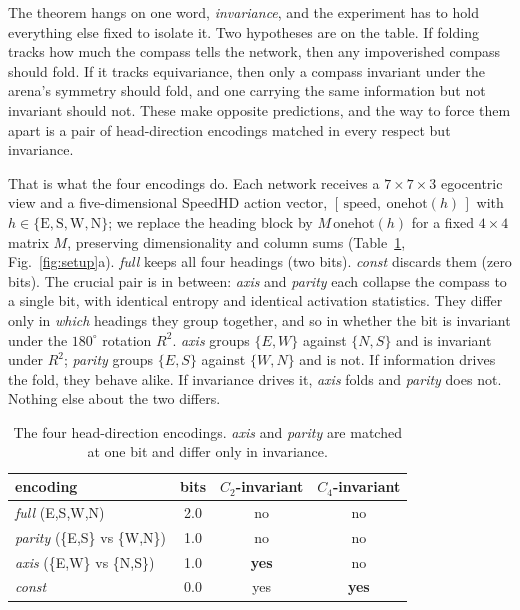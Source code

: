\documentclass[9pt,lineno]{elife}
\begin{document}
The theorem hangs on one word, \emph{invariance}, and the experiment has to hold everything else
fixed to isolate it. Two hypotheses are on the table. If folding tracks how much the compass tells the
network, then any impoverished compass should fold. If it tracks equivariance, then only a compass
invariant under the arena's symmetry should fold, and one carrying the same information but not
invariant should not. These make opposite predictions, and the way to force them apart is a pair of
head-direction encodings matched in every respect but invariance.

That is what the four encodings do. Each network receives a $7\times7\times3$ egocentric view and a
five-dimensional SpeedHD action vector, $[\,\text{speed},\ \mathrm{onehot}(h)\,]$ with $h \in
\{\text{E},\text{S},\text{W},\text{N}\}$; we replace the heading block by $M\,\mathrm{onehot}(h)$ for
a fixed $4\times4$ matrix $M$, preserving dimensionality and column sums (Table~\ref{tab:encodings},
Fig.~\ref{fig:setup}a). \textit{full} keeps all four headings (two bits). \textit{const} discards
them (zero bits). The crucial pair is in between: \textit{axis} and \textit{parity} each collapse the
compass to a single bit, with identical entropy and identical activation statistics. They differ only
in \emph{which} headings they group together, and so in whether the bit is invariant under the
$180^\circ$ rotation $R^2$. \textit{axis} groups $\{E,W\}$ against $\{N,S\}$ and is invariant under
$R^2$; \textit{parity} groups $\{E,S\}$ against $\{W,N\}$ and is not. If information drives the fold,
they behave alike. If invariance drives it, \textit{axis} folds and \textit{parity} does not. Nothing
else about the two differs.

\begin{table}[t]
\centering
\caption{The four head-direction encodings. \textit{axis} and \textit{parity} are matched at
one bit and differ only in invariance.}
\label{tab:encodings}
\begin{tabular}{lccc}
\toprule
encoding & bits & $C_2$-invariant & $C_4$-invariant \\
\midrule
\textit{full} (E,S,W,N)            & 2.0 & no  & no  \\
\textit{parity} (\{E,S\} vs \{W,N\}) & 1.0 & no  & no  \\
\textit{axis} (\{E,W\} vs \{N,S\})   & 1.0 & \textbf{yes} & no \\
\textit{const}                     & 0.0 & yes & \textbf{yes} \\
\bottomrule
\end{tabular}
\end{table}
\end{document}
